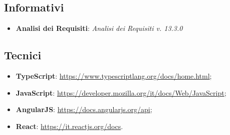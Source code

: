        \subsection{Informativi}
        \begin{itemize}
        	\item \textbf{Analisi dei Requisiti}: \textit{Analisi dei Requisiti v. 13.3.0}
        \end{itemize}
        \subsection{Tecnici}
            \begin{itemize}
                \item \textbf{TypeScript}: \url{https://www.typescriptlang.org/docs/home.html};
                \item \textbf{JavaScript}: \url{https://developer.mozilla.org/it/docs/Web/JavaScript};
                \item \textbf{AngularJS}: \url{https://docs.angularjs.org/api};
                \item \textbf{React}: \url{https://it.reactjs.org/docs}.
            \end{itemize}